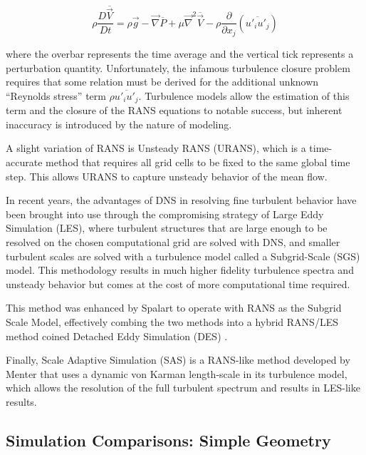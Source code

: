 \documentclass[journal]{new-aiaa}
\begin{document}
\begin{equation}
\label{eqn:rans}
\rho \dfrac{D \overline{\vec{V}}}{D t}
    = \rho\vec{g} - \vec{\nabla} \overline{P}
    + \mu \vec{\nabla}^2 \overline{\vec{V}}
    - \rho \dfrac{\partial}{\partial x_j} \left( \overline{u'_i u'_j} \right)
\end{equation}

\noindent where the overbar represents the time average and the vertical tick represents a perturbation quantity. Unfortunately, the infamous turbulence closure problem requires that some relation must be derived for the additional unknown ``Reynolds stress'' term $\rho \overline{u'_i u'_j}$. Turbulence models allow the estimation of this term and the closure of the RANS equations to notable success, but inherent inaccuracy is introduced by the nature of modeling.

A slight variation of RANS is Unsteady RANS (URANS), which is a time-accurate method that requires all grid cells to be fixed to the same global time step.  This allows URANS to capture unsteady behavior of the mean flow.

In recent years, the advantages of DNS in resolving fine turbulent behavior have been brought into use through the compromising strategy of Large Eddy Simulation (LES), where turbulent structures that are large enough to be resolved on the chosen computational grid are solved with DNS, and smaller turbulent scales are solved with a turbulence model called a Subgrid-Scale (SGS) model. This methodology results in much higher fidelity turbulence spectra and unsteady behavior but comes at the cost of more computational time required.

This method was enhanced by Spalart to operate with RANS as the Subgrid Scale Model, effectively combing the two methods into a hybrid RANS/LES method coined Detached Eddy Simulation (DES) \cite{spalart2009detachededdy}.

Finally, Scale Adaptive Simulation (SAS) is a RANS-like method developed by Menter \cite{menter2005scaleadaptive} that uses a dynamic von Karman length-scale in its turbulence model, which allows the resolution of the full turbulent spectrum and results in LES-like results.











\subsection{Simulation Comparisons: Simple Geometry}
\end{document}
